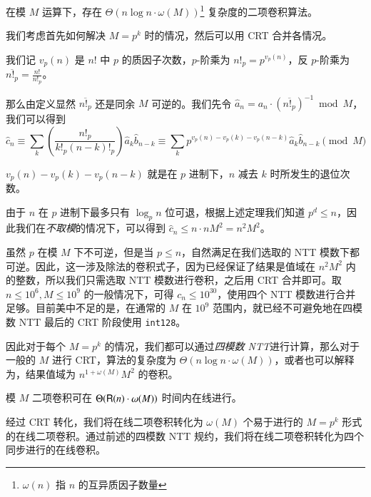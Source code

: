 \begin{theorem}
在模 $M$ 运算下，存在 $\Theta(n\log n \cdot \omega(M))$\footnote{$\omega(n)$ 指 $n$ 的互异质因子数量} 复杂度的二项卷积算法。
\end{theorem}

我们考虑首先如何解决 $M = p^k$ 时的情况，然后可以用 CRT 合并各情况。

我们记 $v_p(n)$ 是 $n!$ 中 $p$ 的质因子次数，$p$-阶乘为 $n!_p = p^{v_p(n)}$，反 $p$-阶乘为 $\overline{n!_p} = \frac{n!}{n!_p}$。

那么由定义显然 $\overline{n!_p}$ 还是同余 $M$ 可逆的。我们先令 $\widehat a_n = a_n \cdot \left( \overline{n!_p} \right)^{-1} \bmod M$，我们可以得到
$$
\widehat c_n \equiv \sum_k \left(\frac{n!_p}{k!_p (n-k)!_p}\right) \widehat a_k \widehat b_{n-k} \equiv \sum_k p^{v_p(n)-v_p(k)-v_p(n-k)} \widehat a_k \widehat b_{n-k} \pmod M
$$

\begin{theorem}[Kummer]

$v_p(n)-v_p(k)-v_p(n-k)$ 就是在 $p$ 进制下，$n$ 减去 $k$ 时所发生的退位次数。

\end{theorem}

由于 $n$ 在 $p$ 进制下最多只有 $\log_p n$ 位可退，根据上述定理我们知道 $p^d \le n$，因此我们在\emph{不取模}的情况下，可以得到 $\widehat c_n \le n \cdot nM^2 = n^2M^2$。

虽然 $p$ 在模 $M$ 下不可逆，但是当 $p\le n$，自然满足在我们选取的 NTT 模数下都可逆。因此，这一涉及除法的卷积式子，因为已经保证了结果是值域在 $n^2M^2$ 内的整数，所以我们只需选取 NTT 模数进行卷积，之后用 CRT 合并即可。取 $n\le 10^6, M\le 10^9$ 的一般情况下，可得 $c_n \le 10^{30}$，使用四个 NTT 模数进行合并足够。目前美中不足的是，在通常的 $M$ 在 $10^9$ 范围内，就已经不可避免地在四模数 NTT 最后的 CRT 阶段使用 \texttt{int128}。

因此对于每个 $M=p^k$ 的情况，我们都可以通过\emph{四模数 NTT}进行计算，那么对于一般的 $M$ 进行 CRT，算法的复杂度为 $\Theta(n\log n \cdot \omega(M))$，或者也可以解释为，结果值域为 $n^{1+\omega(M)}M^2$ 的卷积。

\begin{theorem}
模 $M$ 二项卷积可在 $\Theta(\mathsf R(n)\cdot \omega(M))$ 时间内在线进行。
\end{theorem}

经过 CRT 转化，我们将在线二项卷积转化为 $\omega(M)$ 个易于进行的 $M=p^k$ 形式的在线二项卷积。通过前述的四模数 NTT 规约，我们将在线二项卷积转化为四个同步进行的在线卷积。

